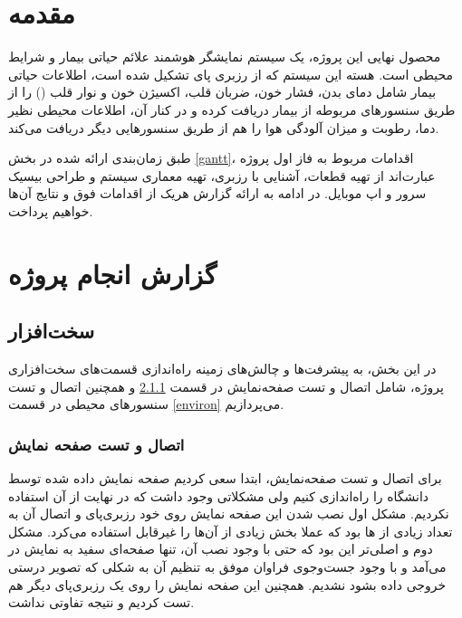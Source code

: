 \documentclass[12pt]{article}
\begin{document}
\newpage
\pagestyle{fancy}
\fancyhf{}
\fancyfoot{}
\cfoot{\thepage}
\chead{}

\newfontfamily{}

\KashidaOff
 \newcommand{\inlineLatin}[1]{
	\small{\lr{{\terminal #1}}}
}


\tableofcontents
\listoffigures

\newpage
\section{مقدمه}


محصول نهایی این پروژه، یک سیستم نمایشگر هوشمند علائم حیاتی بیمار و شرایط محیطی است. هسته این سیستم که از رزبری پای تشکیل شده است، اطلاعات حیاتی بیمار شامل دمای بدن، فشار خون، ضربان قلب، اکسیژن خون و نوار قلب () را از طریق سنسور‌های مربوطه از بیمار دریافت کرده و در کنار آن، اطلاعات محیطی نظیر دما،‌ رطوبت و میزان آلودگی هوا را هم از طریق سنسورهایی دیگر دریافت می‌کند.

طبق زمان‌بندی ارائه شده در بخش \ref{gantt}، اقدامات مربوط به فاز اول پروژه عبارت‌اند از تهیه قطعات، آشنایی با رزبری، تهیه معماری سیستم و طراحی بیسیک سرور و اپ موبایل.
در ادامه به ارائه گزارش هریک از اقدامات فوق و نتایج آن‌ها خواهیم پرداخت.

\section{گزارش انجام پروژه}
\subsection{سخت‌افزار}

در این بخش، به پیشرفت‌ها و چالش‌های زمینه راه‌اندازی قسمت‌های سخت‌افزاری پروژه، شامل اتصال و تست صفحه‌نمایش در قسمت \ref{display} و همچنین اتصال و تست سنسور‌های محیطی در قسمت \ref{environ} می‌پردازیم. 

\subsubsection{اتصال و تست صفحه نمایش} \label{display}

برای اتصال و تست صفحه‌نمایش، ابتدا سعی کردیم صفحه نمایش داده شده توسط دانشگاه را راه‌اندازی کنیم ولی مشکلاتی وجود داشت که در نهایت از آن استفاده نکردیم. مشکل اول نصب شدن این صفحه نمایش روی خود رزبری‌پای و اتصال آن به تعداد زیادی از  ها بود که عملا بخش زیادی از آن‌ها را غیرقابل استفاده می‌کرد. مشکل دوم و اصلی‌تر این بود که حتی با وجود نصب آن، تنها صفحه‌ای سفید به نمایش در می‌آمد و با وجود جست‌وجوی فراوان موفق به تنظیم آن به شکلی که تصویر درستی خروجی داده بشود نشدیم. همچنین این صفحه نمایش را روی یک رزبری‌پای دیگر هم تست کردیم و نتیجه تفاوتی نداشت.
\end{document}

